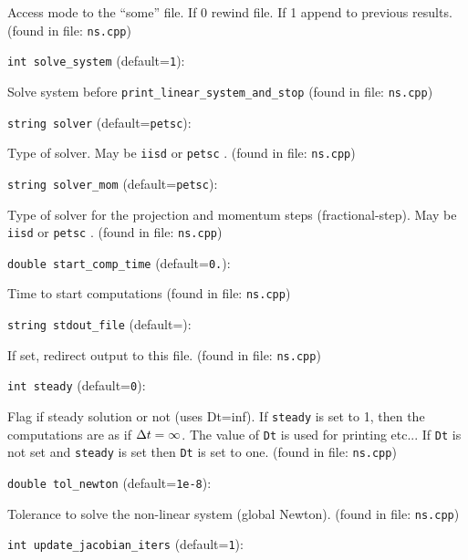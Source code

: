 Access mode to the ``some'' file. If 0 rewind file. If 1 
 append to previous  results.
 (found in file: \verb+ns.cpp+)
\item\verb+int solve_system+ {\rm(default=\verb|1|)}:

Solve system before  \verb+print_linear_system_and_stop+ 
 (found in file: \verb+ns.cpp+)
\item\verb+string solver+ {\rm(default=\verb|petsc|)}:

Type of solver. May be  \verb+iisd+  or  \verb+petsc+ . 
 (found in file: \verb+ns.cpp+)
\item\verb+string solver_mom+ {\rm(default=\verb|petsc|)}:

Type of solver for the projection and momentum steps
(fractional-step). May be  \verb+iisd+  or  \verb+petsc+ .
 (found in file: \verb+ns.cpp+)
\item\verb+double start_comp_time+ {\rm(default=\verb|0.|)}:

Time to start computations
 (found in file: \verb+ns.cpp+)
\item\verb+string stdout_file+ {\rm(default=\verb||)}:

If set, redirect output to this file.
 (found in file: \verb+ns.cpp+)
\item\verb+int steady+ {\rm(default=\verb|0|)}:

Flag if steady solution or not (uses Dt=inf). If  \verb+steady+ 
is set to 1, then the computations are as if ${\Delta t}=\infty$. 
The value of  \verb+Dt+  is used for printing etc... If  \verb+Dt+ 
is not set and  \verb+steady+  is set then  \verb+Dt+  is set to one.
 (found in file: \verb+ns.cpp+)
\item\verb+double tol_newton+ {\rm(default=\verb|1e-8|)}:

Tolerance to solve the non-linear system (global Newton).
 (found in file: \verb+ns.cpp+)
\item\verb+int update_jacobian_iters+ {\rm(default=\verb|1|)}:

